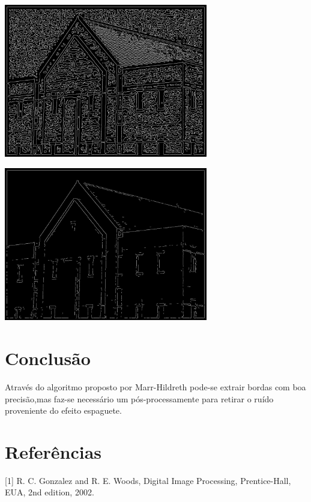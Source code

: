 \documentclass[conference]{IEEEtran}
\begin{document}
 
		\begin{minipage}{\linewidth}
  		\centering
  		\includegraphics[width=3.5in]{images/im4}
		\end{minipage}		
 		

		\begin{minipage}{\linewidth}
  		\centering
  		\includegraphics[width=3.5in]{images/im5}
		\end{minipage}
		 		
	
\section{Conclus\~ao} 
\label{sec:meth} 

Atrav\'es do algoritmo proposto por  Marr-Hildreth pode-se extrair bordas com boa precis\~ao,mas faz-se necess\'ario um p\'os-processamente para retirar o ru\'ido proveniente do efeito espaguete.

\section{Refer\^encias} 
\label{sec:meth} 

[1] R. C. Gonzalez and R. E. Woods, Digital Image Processing,
Prentice-Hall, EUA, 2nd edition, 2002.
\end{document}

